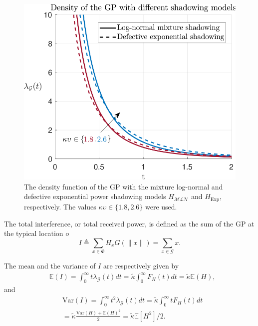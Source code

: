 \documentclass[lettersize,journal]{IEEEtran}
\begin{document}
         \begin{figure}[h]
           \centering
           \includegraphics[width=\linewidth]{plotdensities.pdf}
           \caption{The density function of the GP with the mixture log-normal and defective exponential power shadowing models $H_{\mathcal{MLN}}$ and $H_{\text{Exp}}$, respectively. The values $\kappa \upsilon \in \{1.8,2.6\}$ were used. } 
           \label{fig:plotdensities}
         \end{figure}



The total interference, or total received power, is defined as the sum of the GP at the typical location $\textit{o}$ 
\begin{equation}
  \label{eq:totpow}
  I \triangleq \sum_{x \in \Phi} H_x G(\|x\|) = \sum_{x \in \mathcal{G}} x.
\end{equation}


The mean and the variance of $I$ are respectively given by
\begin{align}
  \label{eq:totmean}
  &\mathbb{E}\left(I \right) = \int_{0}^{\infty} t\lambda_{\mathcal{G}}(t) dt = \tilde{\kappa} \int_{0}^{\infty}F_H(t) dt =\tilde{\kappa} \mathbb{E}(H),
\end{align}
and
\begin{align}
  \label{eq:totvar}
  &\text{Var}\left(I \right) = \int_{0}^{\infty} t^2\lambda_{\mathcal{G}}(t) dt= \tilde{\kappa} \int_0^{\infty}tF_H(t) dt  \nonumber \\
  &= \tilde{\kappa} \frac{\text{Var}(H) + \mathbb{E}(H)^2}{2} = \tilde{\kappa}  \mathbb{E}[H^2]/2.
\end{align}
\end{document}
